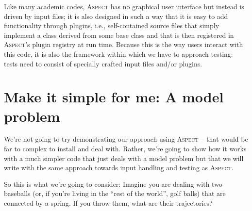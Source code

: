 \documentclass{article}
\newcommand{\aspect}{\textsc{Aspect}}
\begin{document}
Like many academic codes, \aspect{} has no graphical user interface but
instead is driven by input files; it is also designed in such a way that it is
easy to add functionality through plugins, i.e., self-contained source files
that simply implement a class derived from some base class and that is then
registered in \aspect{}'s plugin registry at run time. Because this is the way
users interact with this code, it is also the framework within which we have
to approach testing: tests need to consist of specially crafted input files
and/or plugins.


\section{Make it simple for me: A model problem}

We're not going to try demonstrating our approach using \aspect{} -- that
would be far to complex to install and deal with. Rather, we're going to show
how it works with a much simpler code that just deals with a model problem but
that we will write with the same approach towards input handling and testing
as \aspect{}.

So this is what we're going to consider: Imagine you are dealing with two
baseballs (or, if you're living in the ``rest of the world'', golf balls) that
are connected by a spring. If you throw them, what are their trajectories?
\end{document}

